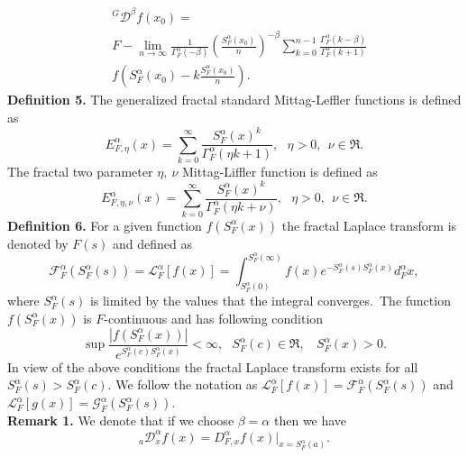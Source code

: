 \documentclass[12pt]{article}
\begin{document}
\begin{align}\label{cdezaqw}
 & ^{G}\mathcal{D}^{\beta} f(x_{0})=\nonumber\\&F-\lim_{n \rightarrow \infty}\frac{1}{\Gamma_{F}^{\alpha}(-\beta)}\left(\frac{S_{F}^{\alpha}(x_{0})}{n}\right)^{-\beta}\sum_{k=0}^{n-1}
  \frac{\Gamma_{F}^{\alpha}(k-\beta)}{\Gamma_{F}^{\alpha}(k+1)}\nonumber\\&f\left(S_{F}^{\alpha}(x_{0})-k\frac{S_{F}^{\alpha}(x_{0})}{n}\right).\nonumber
\end{align}
\textbf{Definition 5.} The generalized fractal standard  Mittag-Leffler functions  is defined as \cite{Golmankhaneh-107-k}
\begin{equation}\label{dawsq9}
  E_{F,\eta}^{\alpha}(x)=\sum_{k=0}^{\infty}\frac{S_{F}^{\alpha}(x)^k}
  {\Gamma_{F}^{\alpha}(\eta k+1)},~~~\eta>0,~~\nu\in \Re.
\end{equation}
The fractal two parameter $\eta,~\nu$ Mittag-Liffler function is defined as
\begin{equation}\label{dawsq9}
  E_{F,\eta,\nu}^{\alpha}(x)=\sum_{k=0}^{\infty}\frac{S_{F}^{\alpha}(x)^k}
  {\Gamma_{F}^{\alpha}(\eta k+\nu)},~~~\eta>0,~~\nu\in \Re.
\end{equation}
\textbf{Definition 6.} For a given function $f(S_{F}^{\alpha}(x))$ the fractal Laplace transform is denoted by $F(s)$ and  defined  as \cite{Golmankhaneh-107-k}
\begin{equation}\label{sewa}
  \mathcal{F}_{F}^{\alpha}(S_{F}^{\alpha}(s))=\mathcal{L}_{F}^{\alpha}[f(x)]=
  \int_{S_{F}^{\alpha}(0)}^{S_{F}^{\alpha}(\infty)}f(x)
e^{-S_{F}^{\alpha}(s)S_{F}^{\alpha}(x)}d_{F}^{\alpha}x,
\end{equation}
where $S_{F}^{\alpha}(s)$ is limited by the values that the integral converges.~The function $f(S_{F}^{\alpha}(x))$ is $F$-continuous  and has following condition
\begin{equation}
\sup\frac{|f(S_{F}^{\alpha}(x))|}{e^{S_{F}^{\alpha}(c)S_{F}^{\alpha}(x)}}<\infty,~~~S_{F}^{\alpha}(c)\in \Re,~~~~S_{F}^{\alpha}(x)>0.
\end{equation}
In view of the above conditions the fractal Laplace transform exists for all $S_{F}^{\alpha}(s)> S_{F}^{\alpha}(c)$.  We follow the notation as $\mathcal{L}_{F}^{\alpha} [f(x)]= \mathcal{F}_{F}^{\alpha}(S_{F}^{\alpha}(s))$ and $\mathcal{L}_{F}^{\alpha} [g(x)]= \mathcal{G}_{F}^{\alpha}(S_{F}^{\alpha}(s))$.\\
\textbf{Remark 1.} We denote that if we choose $\beta=\alpha$ then we have
\begin{equation}\label{gfvgf}
  _{a}\mathcal{D}_{x}^{\alpha} f(x)= D_{F,x}^{\alpha}f(x)|_{x=S_{F}^{\alpha}(a)}.
 \end{equation}
\end{document}
